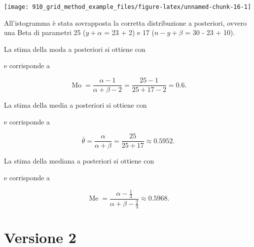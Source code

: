 \documentclass[
]{memoir}
\newenvironment{Shaded}{\begin{snugshade}}{\end{snugshade}}
\newcommand{\CommentTok}[1]{\textcolor[rgb]{0.56,0.35,0.01}{\textit{#1}}}
\newcommand{\FunctionTok}[1]{\textcolor[rgb]{0.00,0.00,0.00}{#1}}
\newcommand{\NormalTok}[1]{#1}
\newcommand{\SpecialCharTok}[1]{\textcolor[rgb]{0.00,0.00,0.00}{#1}}
\DeclareMathOperator{\Me}{Me} %
\DeclareMathOperator{\Mo}{Mo} %
\begin{document}
\begin{center}\texttt{[image: 910\_grid\_method\_example\_files/figure-latex/unnamed-chunk-16-1]} \end{center}

\noindent
All'istogramma è stata sovrapposta la corretta distribuzione a posteriori, ovvero una Beta di parametri 25 (\(y + \alpha\) = 23 + 2) e 17 (\(n - y + \beta\) = 30 - 23 + 10).

La stima della moda a posteriori si ottiene con

\begin{Shaded}
\end{Shaded}

\noindent e corrisponde a

\[
\Mo = \frac{\alpha -1}{\alpha + \beta - 2} = \frac{25 - 1}{25 + 17 - 2} = 0.6.
\]

La stima della media a posteriori si ottiene con

\begin{Shaded}
\end{Shaded}

\noindent e corrisponde a

\[
\bar{\theta} = \frac{\alpha}{\alpha + \beta} = \frac{25}{25 + 17} \approx 0.5952.
\]

La stima della mediana a posteriori si ottiene con

\begin{Shaded}
\end{Shaded}

\noindent e corrisponde a

\[
\Me = \frac{\alpha - \frac{1}{3}}{\alpha + \beta - \frac{2}{3}} \approx 0.5968.
\]

\hypertarget{es-pratico-zetsche-funzioni}{%
\section{Versione 2}\label{es-pratico-zetsche-funzioni}}
\end{document}
